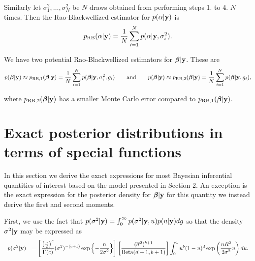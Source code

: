 \documentclass{article}[12pt]
\begin{document}
\noindent Similarly let $\sigma_1^2,\ldots,\sigma_N^2$ be $N$ draws
obtained from performing steps 1. to 4. $N$ times.
Then the Rao-Blackwellized estimator for $p(\alpha|{\bf y})$ is
$$
\displaystyle 
p_{\mbox{\scriptsize RB}}(\alpha|{\bf y})
= \frac{1}{N} \sum_{i=1}^{N} p(\alpha|{\bf y},\sigma_i^2).
$$

\noindent We have two potential Rao-Blackwellized
estimators for ${\boldsymbol \beta}|{\bf y}$. These are
$$
p({\boldsymbol \beta}|{\bf y}) \approx
p_{\mbox{\scriptsize RB,1}}({\boldsymbol \beta}|{\bf y})
= \frac{1}{N} \sum_{i=1}^{N} p({\boldsymbol \beta}|{\bf y},\sigma_i^2,g_i)
\qquad \mbox{and} \qquad
p({\boldsymbol \beta}|{\bf y}) \approx
p_{\mbox{\scriptsize RB,2}}({\boldsymbol \beta}|{\bf y})
= \frac{1}{N} \sum_{i=1}^{N} p({\boldsymbol \beta}|{\bf y},g_i),
$$

\noindent where $p_{\mbox{\scriptsize RB,2}}({\boldsymbol \beta}|{\bf y})$ has a smaller Monte Carlo error compared to 
$p_{\mbox{\scriptsize RB,1}}({\boldsymbol \beta}|{\bf y})$.



\section{Exact posterior distributions in terms of special functions}
\label{sec:Exact}
 
In this section we derive the exact expressions for most Bayesian inferential quantities
of interest based on the model presented in Section 2. An exception is
the exact expression for the posterior density for ${\boldsymbol \beta}|{\bf y}$ for this quantity we
instead derive the first and second moments.


First, we use the fact that $p(\sigma^2|{\bf y}) = \int_0^\infty p(\sigma^2|{\bf y},u) p(u|{\bf y})dg$ so that the density
$\sigma^2|{\bf y}$ may be expressed as
$$
\begin{array}{rl}
\displaystyle p(\sigma^2|{\bf y}) 
& \displaystyle = 
\left[ \frac{\left(\tfrac{n}{2}\right)^c}{\Gamma(c)} (\sigma^2)^{-(c+1)} \exp\left\{ - \frac{n}{2\sigma^2} \right\} \right] 
\left[ \frac{(\widehat{\sigma}^2)^{b+1} }{\mbox{Beta}(d + 1,b+1)} \right]
\int_0^1
u^{b} (1 - u)^d  \exp\left(  \frac{nR^2}{2\sigma^2} u \right) du.
\end{array}
$$
\end{document}
